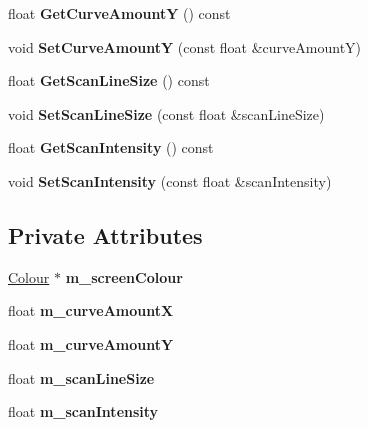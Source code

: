 \begin{DoxyCompactItemize}
float {\bfseries Get\+Curve\+AmountY} () const
\item 
\mbox{\label{class_flounder_1_1_filter_crt_a1d1d5d0333bb36e71cd768cc71615e39}} 
void {\bfseries Set\+Curve\+AmountY} (const float \&curve\+AmountY)
\item 
\mbox{\label{class_flounder_1_1_filter_crt_a5c33d0158e0d38bc02e9c8f706f30f72}} 
float {\bfseries Get\+Scan\+Line\+Size} () const
\item 
\mbox{\label{class_flounder_1_1_filter_crt_a34fa3be66380bebd5cc3de174134c5a0}} 
void {\bfseries Set\+Scan\+Line\+Size} (const float \&scan\+Line\+Size)
\item 
\mbox{\label{class_flounder_1_1_filter_crt_a3b66bf74caa0d342fee18ce1a22a065d}} 
float {\bfseries Get\+Scan\+Intensity} () const
\item 
\mbox{\label{class_flounder_1_1_filter_crt_af3d4400f0114e508cd85dc73f2ef5ea7}} 
void {\bfseries Set\+Scan\+Intensity} (const float \&scan\+Intensity)
\end{DoxyCompactItemize}
\subsection*{Private Attributes}
\begin{DoxyCompactItemize}
\item 
\mbox{\label{class_flounder_1_1_filter_crt_a30acf310a3c75b65b33b42c483be7787}} 
\hyperlink{class_flounder_1_1_colour}{Colour} $\ast$ {\bfseries m\+\_\+screen\+Colour}
\item 
\mbox{\label{class_flounder_1_1_filter_crt_a901eff9fc2796312b7deacc92899327b}} 
float {\bfseries m\+\_\+curve\+AmountX}
\item 
\mbox{\label{class_flounder_1_1_filter_crt_a980f2889e3d6dfb876b07670f1064635}} 
float {\bfseries m\+\_\+curve\+AmountY}
\item 
\mbox{\label{class_flounder_1_1_filter_crt_a352aecadcb8e1109be764ae490cb6cce}} 
float {\bfseries m\+\_\+scan\+Line\+Size}
\item 
\mbox{\label{class_flounder_1_1_filter_crt_a3b9b511c296a5024701f753ef10972c0}} 
float {\bfseries m\+\_\+scan\+Intensity}
\end{DoxyCompactItemize}
